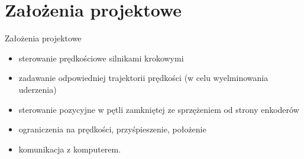 \documentclass{beamer}
\begin{document}
\section{Założenia projektowe}
\begin{frame}{Założenia projektowe}
	\begin{itemize}
		\item {
			sterowanie prędkościowe silnikami krokowymi
		}
		\item {
			zadawanie odpowiedniej trajektorii prędkości (w celu wyelminowania uderzenia)
		}
		\item {
			sterowanie pozycyjne w pętli zamkniętej ze sprzężeniem od strony enkoderów
		}
		\item{
			ograniczenia na prędkości, przyśpieszenie, położenie
		}
		\item{
			komunikacja z komputerem.
		}
	\end{itemize}
\end{frame}
\end{document}
